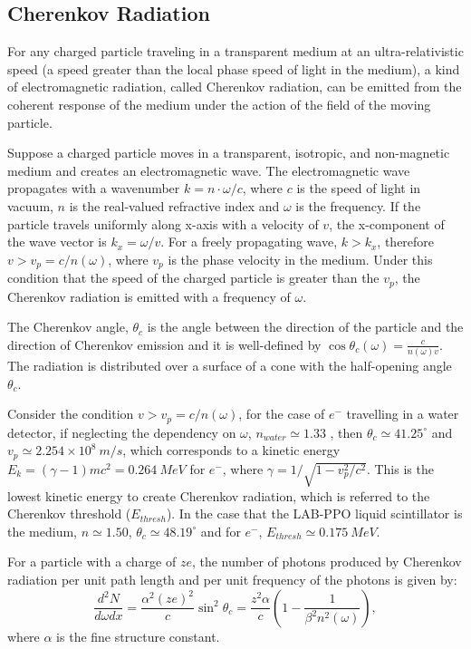 \subsection{Cherenkov Radiation}
For any charged particle traveling in a transparent medium at an ultra-relativistic speed (a speed greater than the local phase speed of light in the medium),  a kind of electromagnetic radiation, called Cherenkov radiation, can be emitted from the coherent response of the medium under the action of the field of the moving particle\cite{jackson2007classical,landau2013electrodynamics}.

Suppose a charged particle moves in a transparent, isotropic, and non-magnetic medium and creates an electromagnetic wave. The electromagnetic wave propagates with a wavenumber $k=n\cdot\omega/c$, where $c$ is the speed of light in vacuum, $n$ is the real-valued refractive index and $\omega$ is the frequency. If the particle travels uniformly along x-axis with a velocity of $v$, the x-component of the wave vector is $k_x=\omega/v$. For a freely propagating wave, $k>k_x$, therefore $v>v_p=c/n(\omega)$, where $v_p$ is the phase velocity in the medium. Under this condition that the speed of the charged particle is greater than the $v_p$, the Cherenkov radiation is emitted with a frequency of $\omega$\cite{landau2013electrodynamics}.   

The Cherenkov angle, $\theta_c$ is the angle between the direction of the particle and the direction of Cherenkov emission and it is well-defined by $\cos\theta_c(\omega) = \frac{c}{n(\omega)v}$. The radiation is distributed over a surface of a cone with the half-opening angle $\theta_c$. 

Consider the condition $v>v_p=c/n(\omega)$, for the case of $e^-$ travelling in a water detector, if neglecting the dependency on $\omega$, $n_{water}\simeq 1.33$ \cite{pdg2018}, then $\theta_c\simeq 41.25^\circ$ and $v_p\simeq 2.254\times10^8~m/s$, which corresponds to a kinetic energy $E_k=(\gamma-1)mc^2=0.264~MeV$ for $e^-$, where $\gamma=1/\sqrt{1-v_p^2/c^2}$. This is the lowest kinetic energy to create Cherenkov radiation, which is referred to the Cherenkov threshold ($E_{thresh}$). In the case that the LAB-PPO liquid scintillator is the medium, $n\simeq 1.50$\cite{tseung2011ellipsometric}, $\theta_c\simeq 48.19^\circ$ and for $e^-$, $E_{thresh}\simeq 0.175~MeV$.   

For a particle with a charge of $ze$, the number of photons produced by Cherenkov radiation per unit path length and per unit frequency of the photons is given by\cite{leo2012techniques}:
\[
\frac{d^2N}{d\omega dx}=\frac{\alpha^2 (ze)^2}{c}\sin^2\theta_c=\frac{z^2\alpha}{c}(1-\frac{1}{\beta^2 n^2(\omega)}),
\]
where $\alpha$ is the fine structure constant.

